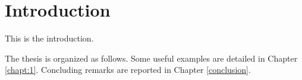 \chapter{Introduction}
\label{introduction}
This is the introduction.

The thesis is organized as follows. Some useful examples are detailed in Chapter \ref{chapt:1}. Concluding remarks are reported in Chapter \ref{conclusion}.


